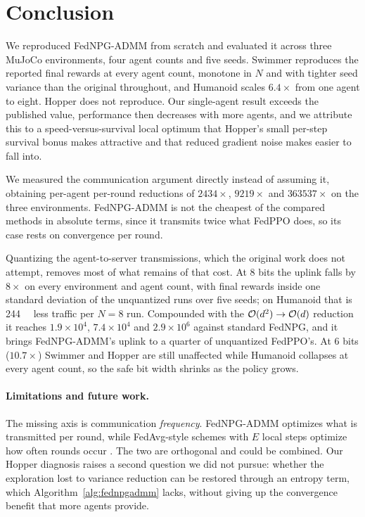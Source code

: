 \section{Conclusion}
\label{sec:conclusion}

We reproduced FedNPG-ADMM from scratch and evaluated it across three MuJoCo
environments, four agent counts and five seeds. Swimmer reproduces the
reported final rewards at every agent count, monotone in $N$ and with tighter
seed variance than the original throughout, and Humanoid scales
$6.4\times$ from one agent to eight. Hopper does not reproduce. Our
single-agent result exceeds the published value, performance then decreases
with more agents, and we attribute this to a speed-versus-survival local
optimum that Hopper's small per-step survival bonus makes attractive and that
reduced gradient noise makes easier to fall into.

We measured the communication argument directly instead of assuming it,
obtaining per-agent per-round reductions of $2434\times$, $9219\times$ and
$363537\times$ on the three environments. FedNPG-ADMM is not the cheapest of
the compared methods in absolute terms, since it transmits twice what FedPPO
does, so its case rests on convergence per round.

Quantizing the agent-to-server transmissions, which the original work does not
attempt, removes most of what remains of that cost. At 8 bits the uplink falls
by $8\times$ on every environment and agent count, with final rewards inside
one standard deviation of the unquantized runs over five seeds; on Humanoid
that is \SI{244}{\giga\byte} less traffic per $N=8$ run. Compounded with the
$\mathcal{O}(d^2) \to \mathcal{O}(d)$ reduction it reaches $1.9\times 10^{4}$,
$7.4\times 10^{4}$ and $2.9\times 10^{6}$ against standard FedNPG, and it
brings FedNPG-ADMM's uplink to a quarter of unquantized FedPPO's. At 6 bits
($10.7\times$) Swimmer and Hopper are still unaffected while Humanoid
collapses at every agent count, so the safe bit width shrinks as the policy
grows.

\paragraph{Limitations and future work.} The missing axis is communication
\emph{frequency}. FedNPG-ADMM optimizes what is transmitted per round, while
FedAvg-style schemes with $E$ local steps optimize how often rounds occur
\citep{jin2022fedrlheterogeneity, khodadadian2022linearspeedup}. The two are
orthogonal and could be combined. Our Hopper diagnosis raises a second
question we did not pursue: whether the exploration lost to variance reduction
can be restored through an entropy term, which Algorithm~\ref{alg:fednpgadmm}
lacks, without giving up the convergence benefit that more agents provide.
